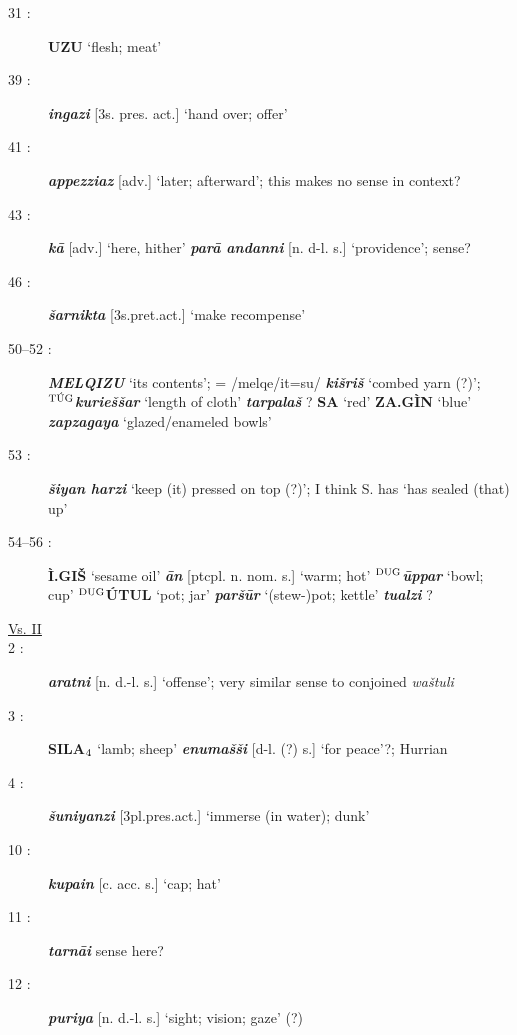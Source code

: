 \documentclass[10pt]{article}
\newcommand{\supersc}[1]{$^{\textrm{\scriptsize{#1}}}$}  	%
\newcommand{\subsc}[1]{$_{\textrm{\scriptsize{#1}}}$}	%
\newcommand{\bit}[1]{\textbf{\textit{#1}}}				%
\newcommand{\p}[1]{{\tiny[{#1}]}}					%
\newcommand{\hith}{\textsubwedge{h}}
\renewcommand{\.}[1]{\textsubdot{#1}}
\begin{document}
\begin{description}
\item[31 :] \textbf{UZU} `flesh; meat'

\item[39 :] \bit{{\hith}ingazi} \p{3s. pres. act.} `hand over; offer'

\item[41 :] \bit{appezziaz} \p{adv.} `later; afterward'; this makes no sense in context?

\item[43 :] \bit{k\=a} \p{adv.} `here, hither' \bit{par\=a {\hith}andanni} \p{n. d-l. s.} `providence'; sense?

\item[46 :] \bit{\v{s}arnikta} \p{3s.pret.act.} `make recompense'

\item[50--52 :] \bit{MELQIZU} `its contents'; = /melqe/it=su/ \bit{ki\v{s}ri\v{s}} `combed yarn (?)'; \textbf{\supersc{T\'UG}}\bit{kurie\v{s}\v{s}ar} `length of cloth' \bit{tarpala\v{s}} ? \textbf{SA} `red' \textbf{ZA.G\`IN} `blue' \bit{zapzagaya} `glazed/enameled bowls'

\item[53 :] \bit{\v{s}iyan harzi} `keep (it) pressed on top (?)'; I think S. has `has sealed (that) up'

\item[54--56 :] \textbf{\`I.GI\v{S}} `sesame oil' \bit{\=an} \p{ptcpl. n. nom. s.} `warm; hot' \textbf{\supersc{DUG}}\bit{{\hith}\=uppar} `bowl; cup' \textbf{\supersc{DUG}\'UTUL} `pot; jar' \bit{par\v{s}\=ur} `(stew-)pot; kettle' \bit{tu{\hith}alzi} ?

\smallskip
\item[\underline{Vs. II}]
\smallskip

\item[2 :] \bit{{\hith}aratni} \p{n. d.-l. s.} `offense'; very similar sense to conjoined \textit{wa\v{s}tuli}

\item[3 :] \textbf{SILA\subsc{4}} `lamb; sheep' \bit{enuma\v{s}\v{s}i} \p{d-l. (?) s.} `for peace'?; Hurrian

\item[4 :] \bit{\v{s}uniyanzi} \p{3pl.pres.act.} `immerse (in water); dunk'

\item[10 :] \bit{kupa{\hith}in} \p{c. acc. s.} `cap; hat'

\item[11 :] \bit{tarn\=ai} sense here?

\item[12 :] \bit{puriya} \p{n. d.-l. s.} `sight; vision; gaze' (?)


\end{description}
\end{document}
